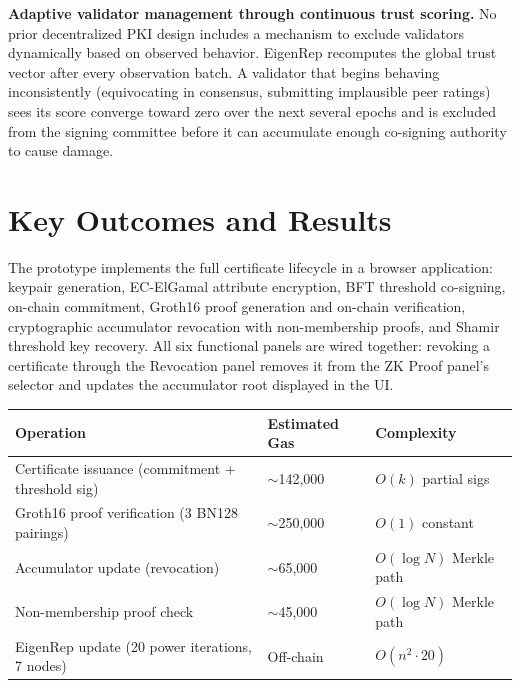 \documentclass[12pt,a4paper]{article}
\begin{document}
\textbf{Adaptive validator management through continuous trust scoring.} No prior decentralized PKI design includes a mechanism to exclude validators dynamically based on observed behavior. EigenRep recomputes the global trust vector after every observation batch. A validator that begins behaving inconsistently (equivocating in consensus, submitting implausible peer ratings) sees its score converge toward zero over the next several epochs and is excluded from the signing committee before it can accumulate enough co-signing authority to cause damage.

\section{Key Outcomes and Results}

The prototype implements the full certificate lifecycle in a browser application: keypair generation, EC-ElGamal attribute encryption, BFT threshold co-signing, on-chain commitment, Groth16 proof generation and on-chain verification, cryptographic accumulator revocation with non-membership proofs, and Shamir threshold key recovery. All six functional panels are wired together: revoking a certificate through the Revocation panel removes it from the ZK Proof panel's selector and updates the accumulator root displayed in the UI.

\begin{center}
\renewcommand{\arraystretch}{1.4}
\begin{tabular}{lll}
\toprule
\textbf{Operation} & \textbf{Estimated Gas} & \textbf{Complexity} \\
\midrule
Certificate issuance (commitment + threshold sig) & $\sim$142,000 & $O(k)$ partial sigs \\
Groth16 proof verification (3 BN128 pairings) & $\sim$250,000 & $O(1)$ constant \\
Accumulator update (revocation) & $\sim$65,000 & $O(\log N)$ Merkle path \\
Non-membership proof check & $\sim$45,000 & $O(\log N)$ Merkle path \\
EigenRep update (20 power iterations, 7 nodes) & Off-chain & $O(n^2 \cdot 20)$ \\
\bottomrule
\end{tabular}
\end{center}
\end{document}
